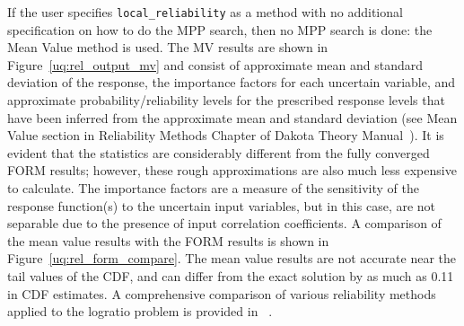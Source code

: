If the user specifies \texttt{local\_reliability} as a method with no
additional specification on how to do the MPP search, then no MPP
search is done: the Mean Value method is used. The MV results are
shown in Figure~\ref{uq:rel_output_mv} and consist of approximate mean
and standard deviation of the response, the importance factors for
each uncertain variable, and approximate probability/reliability
levels for the prescribed response levels that have been inferred from
the approximate mean and standard deviation (see Mean Value section in
Reliability Methods Chapter of Dakota Theory
Manual~\cite{TheoMan}). It is evident that the statistics are
considerably different from the fully converged FORM results; however,
these rough approximations are also much less expensive to
calculate. The importance factors are a measure of the sensitivity of
the response function(s) to the uncertain input variables, but in this
case, are not separable due to the presence of input correlation
coefficients. A comparison of the mean value results with the FORM
results is shown in Figure~\ref{uq:rel_form_compare}. The mean value
results are not accurate near the tail values of the CDF, and can
differ from the exact solution by as much as 0.11 in CDF estimates. A
comprehensive comparison of various reliability methods applied to the
logratio problem is provided in ~\cite{Eld06a}.

